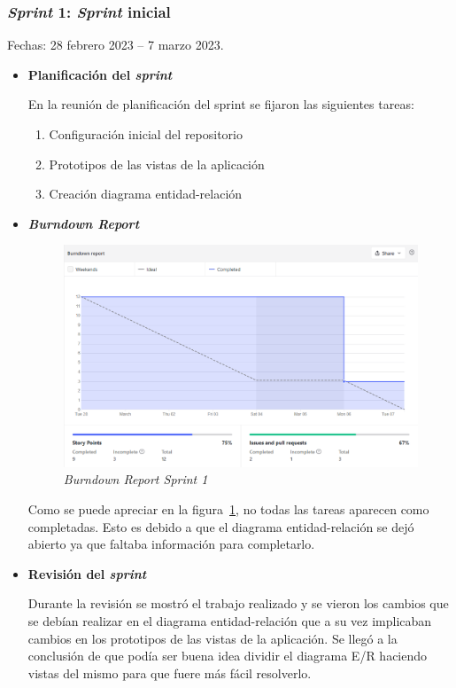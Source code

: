\subsubsection{\textit{Sprint} 1: \textit{Sprint} inicial}
Fechas: 28 febrero 2023 -- 7 marzo 2023.
\begin{itemize}
\item\textbf{Planificación del \textit{sprint}}

En la reunión de planificación del sprint se fijaron las siguientes tareas:
\begin{enumerate}
	\item Configuración inicial del repositorio
	\item Prototipos de las vistas de la aplicación
	\item Creación diagrama entidad-relación
\end{enumerate}

\item\textbf{\textit{Burndown Report}}

\begin{figure}
	\centering
	\includegraphics[width=\textwidth]{../img/Anexos/Sprints/Sprint1.png}
	\caption{\textit{Burndown Report Sprint 1}}\label{ReportSprint1}
\end{figure}

Como se puede apreciar en la figura~\ref{ReportSprint1}, no todas las tareas aparecen como completadas. Esto es debido a que el diagrama entidad-relación se dejó abierto ya que faltaba información para completarlo.

\item\textbf{Revisión del \textit{sprint}}

Durante la revisión se mostró el trabajo realizado y se vieron los cambios que se debían realizar en el diagrama entidad-relación que a su vez implicaban cambios en los prototipos de las vistas de la aplicación.
Se llegó a la conclusión de que podía ser buena idea dividir el diagrama E/R haciendo vistas del mismo para que fuere más fácil resolverlo.
\end{itemize}



